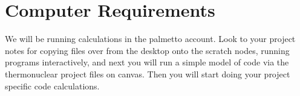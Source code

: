 \section*{Computer Requirements}

We will be running calculations in the palmetto account. Look to your project notes for copying files over from the desktop onto the scratch nodes, running programs interactively, and next you will run a simple model of code via the thermonuclear project files on canvas. Then you will start doing your project specific code calculations. 



